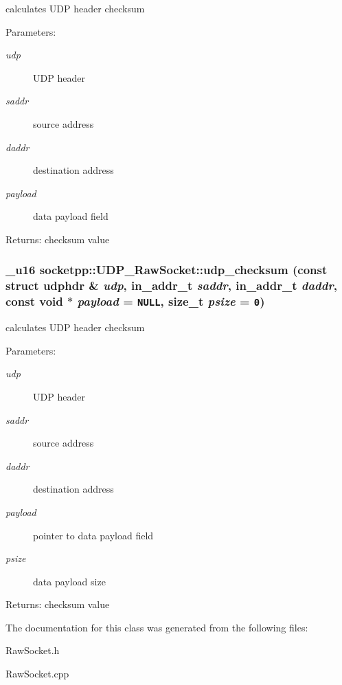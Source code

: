 calculates UDP header checksum 

\begin{Desc}
\item[Parameters:]
\begin{description}
\item[{\em udp}]UDP header \item[{\em saddr}]source address \item[{\em daddr}]destination address \item[{\em payload}]data payload field \end{description}
\end{Desc}
\begin{Desc}
\item[Returns:]checksum value \end{Desc}
\hypertarget{classsocketpp_1_1UDP__RawSocket_095971358f1de99857aaf649aae9b1ea}{
\subsubsection[{udp\_\-checksum}]{\setlength{\rightskip}{0pt plus 5cm}\_\-u16 socketpp::UDP\_\-RawSocket::udp\_\-checksum (const struct udphdr \& {\em udp}, \/  in\_\-addr\_\-t {\em saddr}, \/  in\_\-addr\_\-t {\em daddr}, \/  const void $\ast$ {\em payload} = {\tt NULL}, \/  size\_\-t {\em psize} = {\tt 0})}}
\label{classsocketpp_1_1UDP__RawSocket_095971358f1de99857aaf649aae9b1ea}


calculates UDP header checksum 

\begin{Desc}
\item[Parameters:]
\begin{description}
\item[{\em udp}]UDP header \item[{\em saddr}]source address \item[{\em daddr}]destination address \item[{\em payload}]pointer to data payload field \item[{\em psize}]data payload size \end{description}
\end{Desc}
\begin{Desc}
\item[Returns:]checksum value \end{Desc}


The documentation for this class was generated from the following files:\begin{CompactItemize}
\item 
RawSocket.h\item 
RawSocket.cpp\end{CompactItemize}
